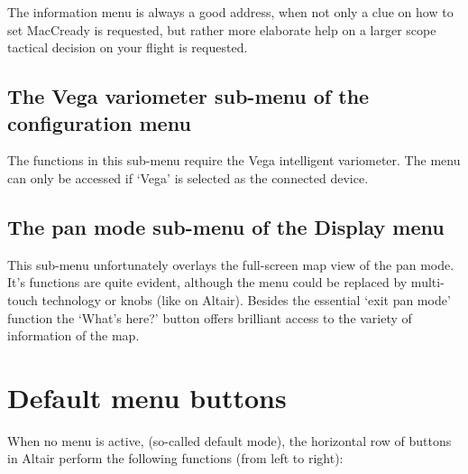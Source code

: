 The information menu is always a good address, when not only a clue on how to set MacCready is requested, but rather more elaborate help on a larger scope tactical decision on your flight is requested.


\subsection*{The Vega variometer sub-menu of the configuration menu}

\noindent{}

The functions in this sub-menu require the Vega intelligent variometer. The menu can only be accessed if `Vega' is selected as the connected device.

\subsection*{The pan mode sub-menu of the Display menu}

\noindent{}

This sub-menu unfortunately overlays the full-screen map view of the pan mode. It's functions are quite evident, although the menu could be replaced by multi-touch technology or knobs (like on Altair). Besides the essential `exit pan mode' function the `What's here?' button offers brilliant access to the variety of information of the map.

\section{Default menu buttons}

When no menu is active, (so-called default mode), the horizontal row
of buttons in Altair perform the following functions (from left to right):

